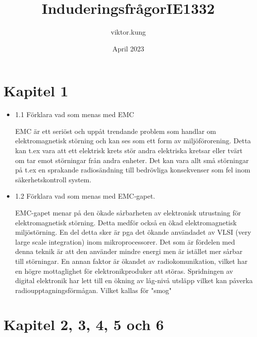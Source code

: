 \documentclass{article}
\title{InduderingsfrågorIE1332}
\author{viktor.kung }
\date{April 2023}
\begin{document}
\maketitle

\section{Kapitel 1}

\begin{itemize}
    \item 1.1 Förklara vad som menas med EMC

        EMC är ett seriöst och uppåt trendande problem som handlar om elektromagnetisk störning och kan ses som ett form av miljöförorening. Detta kan t.ex vara att ett elektrisk krets stör andra elektriska kretsar eller tvärt om tar emot störningar från andra enheter. Det kan vara allt små störningar på t.ex en sprakande radiosändning till bedrövliga konsekvenser som fel inom säkerhetskontroll system.

\item 1.2 Förklara vad som menas med EMC‐gapet.

        EMC-gapet menar på den ökade sårbarheten av elektronisk utrustning för elektromagnetisk störning. Detta medför också en ökad elektromagnetisk miljöstörning. En del detta sker är pga det ökande användadet av VLSI (very large scale integration) inom mikroprocessorer. Det som är fördelen med denna teknik är att den använder mindre energi men är istället mer sårbar till störningar. En annan faktor är ökandet av radiokomunikation, vilket har en högre mottaglighet för elektronikproduker att störas. Spridningen av digital elektronik har lett till en ökning av låg-nivå utsläpp vilket kan påverka radioupptagningsförmågan. Vilket kallas för "smog"

\end{itemize}

\section{Kapitel 2, 3, 4, 5 och 6}
\end{document}
